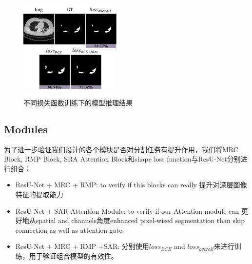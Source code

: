 \documentclass{ieeeaccess}
\begin{document}
  \begin{figure}[htbp]
    \begin{center}
    \includegraphics[width=0.45\textwidth]{figure/abliation_loss_img.pdf}
    \vspace{-2mm}
    \caption{不同损失函数训练下的模型推理结果} 
    \vspace{-2mm}
    \label{fig:ablation_loss}
    \end{center}
    \vspace{-0.35cm}
  \end{figure}




  \subsection{Modules}
  为了进一步验证我们设计的各个模块是否对分割任务有提升作用，我们将MRC Block, RMP Block, SRA Attention Block和shape loss function与ResU-Net分别进行组合：
  \begin{itemize}
      \item ResU-Net + MRC + RMP: to verify if this blocks can really 提升对深层图像特征的提取能力
      \item ResU-Net + SAR Attention Module: to verify if our Attention module can 更好地从spatial and channels角度enhanced pixel-wised segmentation than skip connection as well as
            attention-gate.
      \item ResU-Net + MRC + RMP +SAR: 分别使用\(loss_{BCE}\) and \(loss_{overall}\)来进行训练，用于验证组合模型的有效性。
  \end{itemize}
\end{document}
